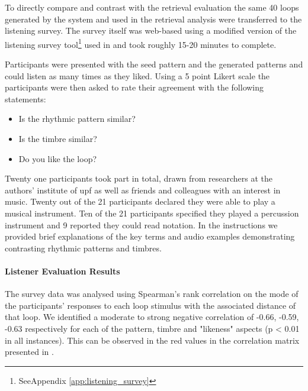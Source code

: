 To directly compare and contrast with the retrieval evaluation the same 40 loops generated by the system and used in the retrieval analysis were transferred to the listening survey. The survey itself was web-based using a modified version of the listening survey tool\footnote{SeeAppendix \ref{app:listening_survey}} used in  and took roughly 15-20 minutes to complete.

Participants were presented with the seed pattern and the generated patterns and could listen as many times as they liked. Using a 5 point Likert scale the participants were then asked to rate their agreement with the following statements:

\begin{itemize}
  \item Is the rhythmic pattern similar?
  \item Is the timbre similar?
  \item Do you like the loop?
\end{itemize}

Twenty one participants took part in total, drawn from researchers at the authors' institute of \acrshort{upf} as well as friends and colleagues with an interest in music. Twenty out of the 21 participants declared they were able to play a musical instrument.  Ten of the 21 participants specified they played a percussion instrument and 9 reported they could read notation. In the instructions we provided brief explanations of the key terms and audio examples demonstrating contrasting rhythmic patterns and timbres.

\paragraph{Listener Evaluation Results}

The survey data was analysed using Spearman's rank correlation on the mode of the participants' responses to each loop stimulus with the associated distance of that loop. We identified a moderate to strong negative correlation of -0.66, -0.59, -0.63 respectively for each of the pattern, timbre and "likeness" aspects (p < 0.01 in all instances). This can be observed in the red values in the correlation matrix presented in .

